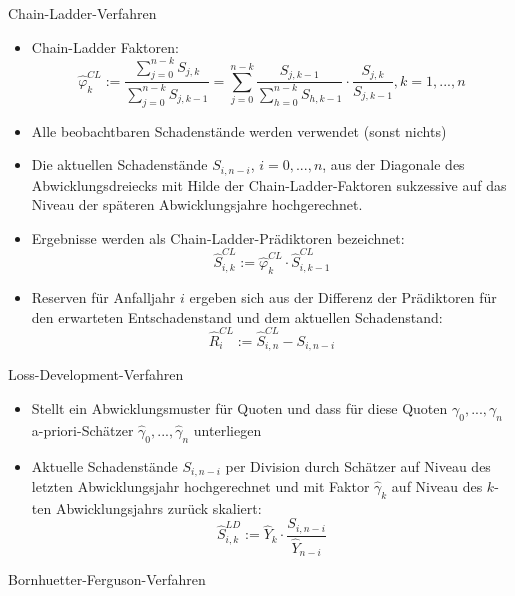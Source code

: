 \documentclass[12pt]{report}
\theoremstyle{dotless}
\theoremstyle{definition}
\begin{document}
Chain-Ladder-Verfahren
\begin{itemize}
\item Chain-Ladder Faktoren:
\begin{equation}
\hat{\varphi}_k^{CL} := \frac{\sum_{j=0}^{n-k} S_{j,k}}{\sum_{j=0}^{n-k} S_{j,k-1}}= \sum_{j=0}^{n-k} \frac{S_{j,k-1}}{\sum_{h=0}^{n-k} S_{h,k-1}} \cdot \frac{S_{j,k}}{S_{j,k-1}}, k=1,...,n
\end{equation}
\item Alle beobachtbaren Schadenstände werden verwendet (sonst nichts)
\item Die aktuellen Schadenstände $S_{i,n-i}$, $i=0,...,n$, aus der Diagonale des Abwicklungsdreiecks mit Hilde der Chain-Ladder-Faktoren sukzessive auf das Niveau der späteren Abwicklungsjahre hochgerechnet.
\item Ergebnisse werden als Chain-Ladder-Prädiktoren bezeichnet:
\begin{equation}
\hat{S}_{i,k}^{CL}:= \hat{\varphi}_k^{CL} \cdot \hat{S}_{i,k-1}^{CL}
\end{equation}
\item Reserven für Anfalljahr $i$ ergeben sich aus der Differenz der Prädiktoren für den erwarteten Entschadenstand und dem aktuellen Schadenstand:
\begin{equation}
\hat{R}_i^{CL}:= \hat{S}_{i,n}^{CL} - S_{i,n-i}
\end{equation}
\end{itemize}
Loss-Development-Verfahren
\begin{itemize}
\item Stellt ein Abwicklungsmuster für Quoten und dass für diese Quoten $\gamma_0, ...,\gamma_n$ a-priori-Schätzer $\hat{\gamma}_0, ..., \hat{\gamma}_n$ unterliegen 
\item Aktuelle Schadenstände $S_{i, n-i}$ per Division durch Schätzer auf Niveau des letzten Abwicklungsjahr hochgerechnet und mit Faktor $\hat{\gamma}_k$ auf Niveau des $k$-ten Abwicklungsjahrs zurück skaliert:
\begin{equation}
\hat{S}_{i,k}^{LD} := \hat{Y}_k \cdot \frac{S_{i,n-i}}{\hat{Y}_{n-i}}
\end{equation}
\end{itemize}
Bornhuetter-Ferguson-Verfahren
\end{document}
